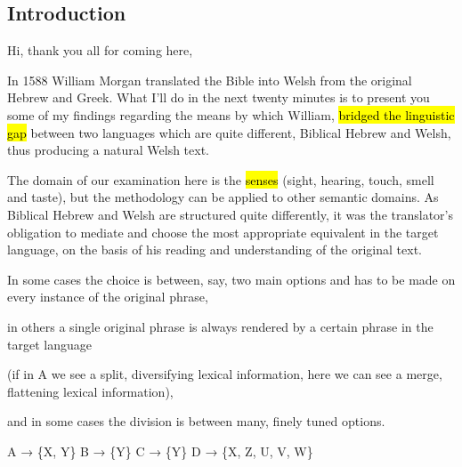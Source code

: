 \begin{paper}
	\setcounter{section}{-1}
	\section{Introduction}

	{\click} Hi, thank you all for coming here,

	{\click} In 1588 William Morgan translated the Bible into Welsh from the original Hebrew and Greek. What I’ll do in the next twenty minutes is to present you some of my findings regarding the means by which William, \hl{bridged the linguistic gap} between two languages which are quite different, Biblical Hebrew and Welsh, thus producing a natural Welsh text.

	The domain of our examination here is the \hl{senses} (sight, hearing, touch, smell and taste), but the methodology can be applied to other semantic domains. As Biblical Hebrew and Welsh are structured quite differently, it was the translator’s obligation to mediate and choose the most appropriate equivalent in the target language, on the basis of his reading and understanding of the original text.

	\begin{compactitem}
		\item {\click}  In some cases the choice is between, say, two main options and has to be made on every instance of the original phrase,
		\item {} in others a single original phrase is always rendered by a certain phrase in the target language
			\begin{compactitem}
				\item (if in A we see a split, diversifying lexical information, here  we can see a merge, flattening lexical information),
			\end{compactitem}
		\item and in  some cases the division is between many, finely tuned options.
	\end{compactitem}
\end{paper}

\begin{hopoint}
	A → \{X, Y\}\hfill
	B → \{Y\}\hfill
	C → \{Y\}\hfill
	D → \{X, Z, U, V, W\}
\end{hopoint}

